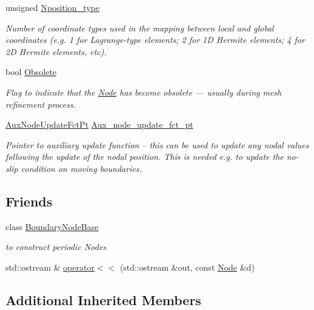 \begin{DoxyCompactItemize}
unsigned \hyperlink{classoomph_1_1Node_aa5419b3f46cb65976e1e1311eed9419d}{Nposition\+\_\+type}
\begin{DoxyCompactList}\small\item\em Number of coordinate types used in the mapping between local and global coordinates (e.\+g. 1 for Lagrange-\/type elements; 2 for 1D Hermite elements; 4 for 2D Hermite elements, etc). \end{DoxyCompactList}\item 
bool \hyperlink{classoomph_1_1Node_ae25c446374781036779c46bd8c1a2d74}{Obsolete}
\begin{DoxyCompactList}\small\item\em Flag to indicate that the \hyperlink{classoomph_1_1Node}{Node} has become obsolete --- usually during mesh refinement process. \end{DoxyCompactList}\item 
\hyperlink{classoomph_1_1Node_afcc4cc3e1e48964baf23fa44c98293a9}{Aux\+Node\+Update\+Fct\+Pt} \hyperlink{classoomph_1_1Node_a8bfd206ba303b6d446f59974719b24b6}{Aux\+\_\+node\+\_\+update\+\_\+fct\+\_\+pt}
\begin{DoxyCompactList}\small\item\em Pointer to auxiliary update function -- this can be used to update any nodal values following the update of the nodal position. This is needed e.\+g. to update the no-\/slip condition on moving boundaries. \end{DoxyCompactList}\end{DoxyCompactItemize}
\subsection*{Friends}
\begin{DoxyCompactItemize}
\item 
class \hyperlink{classoomph_1_1Node_a3d5c6d911301ca1704ce34955d8b3c6b}{Boundary\+Node\+Base}
\begin{DoxyCompactList}\small\item\em to construct periodic Nodes \end{DoxyCompactList}\item 
std\+::ostream \& \hyperlink{classoomph_1_1Node_acdfb367cd4c2661ea1edf78baa40014c}{operator$<$$<$} (std\+::ostream \&out, const \hyperlink{classoomph_1_1Node}{Node} \&d)
\end{DoxyCompactItemize}
\subsection*{Additional Inherited Members}



